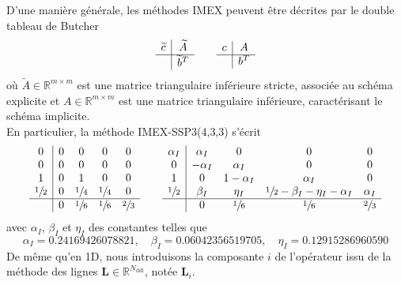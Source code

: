 \documentclass[11pt, a4paper, oneside]{report}
\begin{document}
\begin{samepage}
D'une manière générale, les méthodes IMEX peuvent être décrites par le double tableau de Butcher
\begin{equation}
    \begin{array}{c|c}
        \widetilde{c} & \widetilde{A} \\
        \hline
        & \widetilde{b}^T
    \end{array} \qquad
    \begin{array}{c|c}
        c & A \\
        \hline
        & b^T        
    \end{array}
\end{equation}
où $\widetilde{A} \in \mathbb{R}^{m \times m}$ est une matrice triangulaire inférieure stricte, associée au schéma explicite et ${A \in \mathbb{R}^{m \times m}}$ est une matrice triangulaire inférieure, caractérisant le schéma implicite. \\
En particulier, la méthode IMEX-SSP3(4,3,3) s'écrit
\begin{equation}
    \begin{array}{c|cccc}
        0 & 0 & 0 & 0 & 0 \\
        0 & 0 & 0 & 0 & 0 \\
        1 & 0 & 1 & 0 & 0 \\
        \sfrac{1}{2} & 0 & \sfrac{1}{4} & \sfrac{1}{4} & 0 \\
        \hline
        & 0 & \sfrac{1}{6} & \sfrac{1}{6} & \sfrac{2}{3}
    \end{array} \qquad
    \begin{array}{c|cccc}
        \alpha_I & \alpha_I & 0 & 0 & 0 \\
        0 & -\alpha_I & \alpha_I & 0 & 0 \\
        1 & 0 & 1-\alpha_I & \alpha_I & 0 \\
        \sfrac{1}{2} & \beta_I & \eta_I & \sfrac{1}{2} - \beta_I - \eta_I - \alpha_I & \alpha_I \\
        \hline
        & 0 & \sfrac{1}{6} & \sfrac{1}{6} & \sfrac{2}{3}
    \end{array}
\end{equation}
avec $\alpha_I$, $\beta_I$ et $\eta_I$ des constantes telles que
\begin{equation}
    \alpha_I = 0.24169426078821, \quad \beta_I = 0.06042356519705, \quad \eta_I = 0.12915286960590
\end{equation}
De même qu'en 1D, nous introduisons la composante $i$ de l'opérateur issu de la méthode des lignes $\bm{L} \in \mathbb{R}^{N_\text{ddl}}$, notée $\bm{L}_i$. \\

\end{samepage}
\end{document}
